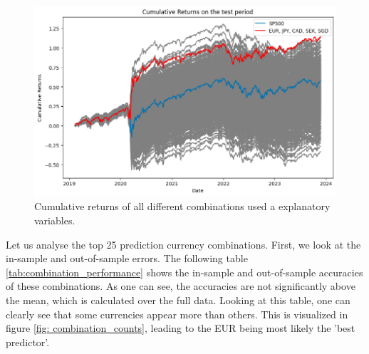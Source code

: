 \begin{figure}[h!]
\begin{center}
  \includegraphics[width=\textwidth]{images/best_predictor.png}
  \end{center}
  \caption[Cumulative returns of all currency combinations]{Cumulative returns of all different combinations used a explanatory variables.}
  \label{fig: cumulative returns}
\end{figure}

\noindent Let us analyse the top 25 prediction currency combinations. First, we look at the in-sample and out-of-sample errors. The following table \ref{tab:combination_performance} shows the in-sample and out-of-sample accuracies of these combinations. As one can see, the accuracies are not significantly above the mean, which is calculated over the full data. Looking at this table, one can clearly see that some currencies appear more than others. This is visualized in figure \ref{fig: combination_counts}, leading to the EUR being most likely the 'best predictor'.


